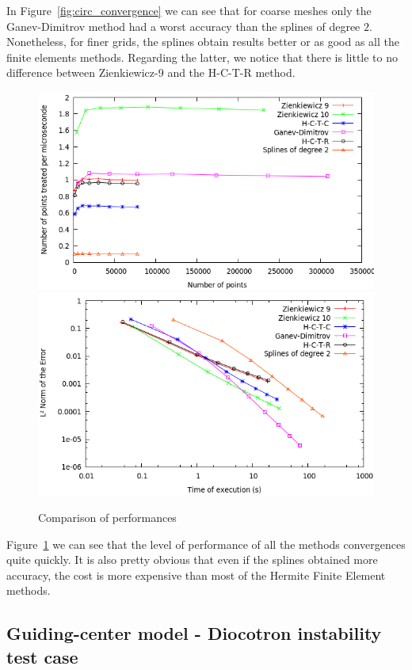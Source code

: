 \documentclass[proc]{edpsmath}
\begin{document}
In Figure~\ref{fig:circ_convergence} we can see that for coarse meshes only the Ganev-Dimitrov method had a worst accuracy than the splines of degree $2$. Nonetheless, for finer grids, the splines obtain results better or as good as all the finite elements methods. Regarding the latter, we notice that there is little to no difference between Zienkiewicz-9 and the H-C-T-R method. 

\begin{figure}[h!]
	\label{fig:circ_performance}
	\includegraphics[scale=0.35]{figures/efficiency.png}
	\includegraphics[scale=0.35]{figures/time_norm.png}
	\caption{Comparison of performances }
\end{figure}

Figure~\ref{fig:circ_performance} we can see that the level of performance of all the methods convergences quite quickly. It is also pretty obvious that even if the splines obtained more accuracy, the cost is more expensive than most of the Hermite Finite Element methods.

\subsection{Guiding-center model - Diocotron instability test case}
\end{document}

